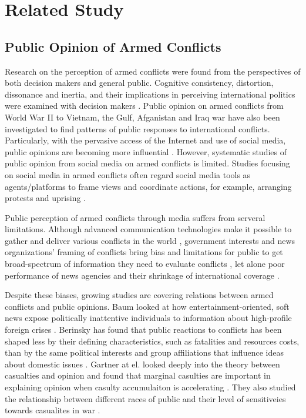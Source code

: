 \section{Related Study}
\subsection{Public Opinion of Armed Conflicts}
Research on the perception of armed conflicts were found from the perspectives of both decision makers and general public. Cognitive consistency, distortion, dissonance and inertia, and their implications in perceiving international politics were examined with decision makers \cite{Jervis1976}. Public opinion on armed conflicts from World War II to Vietnam, the Gulf, Afganistan and Iraq war have also been investigated to find patterns of public responses to international conflicts. Particularly, with the pervasive access of the Internet and use of social media, public opinions are becoming more influential \cite{Shirky2011}. However, systematic studies of public opinion from social media on armed conflicts is limited. Studies focusing on social media in armed conflicts often regard social media tools as agents/platforms to frame views and coordinate actions, for example, arranging protests and uprising \cite{Lim2012}.

Public perception of armed conflicts through media suffers from serveral limitations. Although advanced communication technologies make it possible to gather and deliver various conflicts in the world \cite{Sacco2015}, government interests and news organizations' framing of conflicts bring bias and limitations for public to get broad-spectrum of information they need to evaluate conflicts \cite{Nelson1997}, let alone poor performance of news agencies and their shrinkage of international coverage \cite{Seib2004}. 

Despite these biases, growing studies are covering relations between armed conflicts and public opinions. Baum looked at how entertainment-oriented, soft news expose politically inattentive individuals to information about high-profile foreign crises \cite{Baum2002}. Berinsky has found that public reactions to conflicts has been shaped less by their defining characteristics, such as fatalities and resources costs, than by the same political interests and group affiliations that influence ideas about domestic issues \cite{Berinsky2009}. Gartner at el. looked deeply into the theory between casualties and opinion and found that marginal casulties are important in explaining opinion when casulty accumulaiton is accelerating \cite{Gartner1998}. They also studied the relationship between different races of public and their level of sensitiveies towards casualites in war \cite{Gartner2000}. 

